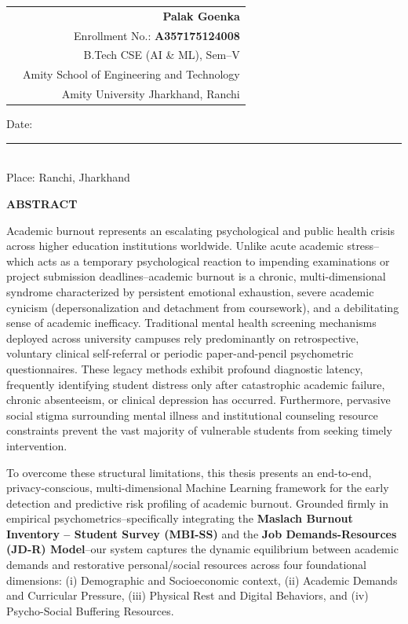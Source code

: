 \documentclass[12pt,a4paper,oneside]{report}
\begin{document}
\vspace{2.5cm}

\noindent
\begin{tabularx}{\textwidth}{Xr}
& \textbf{Palak Goenka} \\
& Enrollment No.: \textbf{A357175124008} \\
& B.Tech CSE (AI \& ML), Sem--V \\
& Amity School of Engineering and Technology \\
& Amity University Jharkhand, Ranchi
\end{tabularx}

\vspace{1.5cm}
\noindent
Date: \rule{3.5cm}{0.4pt} \\
Place: Ranchi, Jharkhand

\clearpage

\thispagestyle{plain}
\begin{center}
    {\LARGE \textbf{ABSTRACT}}\\[0.8cm]
\end{center}

Academic burnout represents an escalating psychological and public health crisis across higher education institutions worldwide. Unlike acute academic stress--which acts as a temporary psychological reaction to impending examinations or project submission deadlines--academic burnout is a chronic, multi-dimensional syndrome characterized by persistent emotional exhaustion, severe academic cynicism (depersonalization and detachment from coursework), and a debilitating sense of academic inefficacy. Traditional mental health screening mechanisms deployed across university campuses rely predominantly on retrospective, voluntary clinical self-referral or periodic paper-and-pencil psychometric questionnaires. These legacy methods exhibit profound diagnostic latency, frequently identifying student distress only after catastrophic academic failure, chronic absenteeism, or clinical depression has occurred. Furthermore, pervasive social stigma surrounding mental illness and institutional counseling resource constraints prevent the vast majority of vulnerable students from seeking timely intervention.

To overcome these structural limitations, this thesis presents an end-to-end, privacy-conscious, multi-dimensional Machine Learning framework for the early detection and predictive risk profiling of academic burnout. Grounded firmly in empirical psychometrics--specifically integrating the \textbf{Maslach Burnout Inventory -- Student Survey (MBI-SS)} and the \textbf{Job Demands-Resources (JD-R) Model}--our system captures the dynamic equilibrium between academic demands and restorative personal/social resources across four foundational dimensions: (i) Demographic and Socioeconomic context, (ii) Academic Demands and Curricular Pressure, (iii) Physical Rest and Digital Behaviors, and (iv) Psycho-Social Buffering Resources. 
\end{document}
